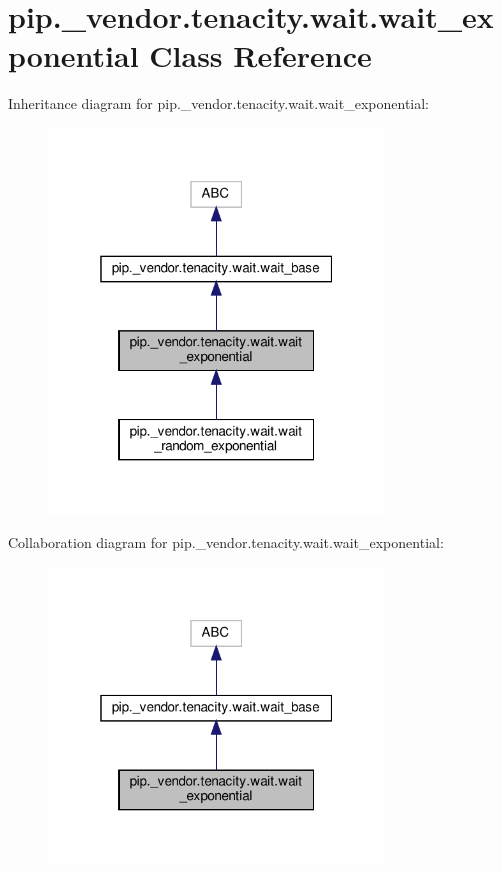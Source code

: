 \hypertarget{classpip_1_1__vendor_1_1tenacity_1_1wait_1_1wait__exponential}{}\section{pip.\+\_\+vendor.\+tenacity.\+wait.\+wait\+\_\+exponential Class Reference}
\label{classpip_1_1__vendor_1_1tenacity_1_1wait_1_1wait__exponential}


Inheritance diagram for pip.\+\_\+vendor.\+tenacity.\+wait.\+wait\+\_\+exponential\+:
\nopagebreak
\begin{figure}[H]
\begin{center}
\leavevmode
\includegraphics[width=253pt]{classpip_1_1__vendor_1_1tenacity_1_1wait_1_1wait__exponential__inherit__graph}
\end{center}
\end{figure}


Collaboration diagram for pip.\+\_\+vendor.\+tenacity.\+wait.\+wait\+\_\+exponential\+:
\nopagebreak
\begin{figure}[H]
\begin{center}
\leavevmode
\includegraphics[width=253pt]{classpip_1_1__vendor_1_1tenacity_1_1wait_1_1wait__exponential__coll__graph}
\end{center}
\end{figure}
